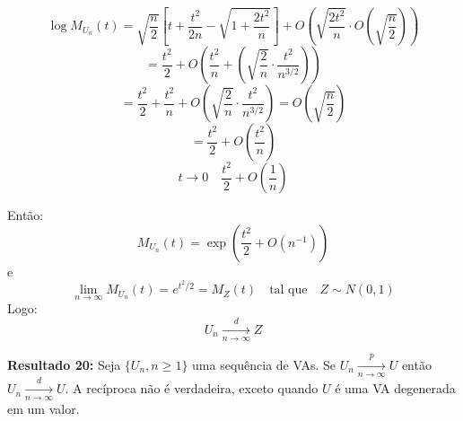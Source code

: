 \[
\log M_{U_n}(t) = \sqrt{\frac{n}{2}} \left[ t + \frac{t^2}{2n} - \sqrt{1 + \frac{2t^2}{n}} \right] + O\left( \sqrt{\frac{2t^2}{n}} \cdot O\left( \sqrt{\frac{n}{2}} \right) \right)
\]
\[
= \frac{t^2}{2} + O\left( \frac{t^2}{n} + \left( \sqrt{\frac{2}{n}} \cdot \frac{t^2}{n^{3/2}} \right) \right)
\]
\[
= \frac{t^2}{2} + \frac{t^2}{n} + O\left( \sqrt{\frac{2}{n}} \cdot \frac{t^2}{n^{3/2}} \right) = O\left( \sqrt{\frac{n}{2}} \right)
\]
\[
= \frac{t^2}{2} + O\left( \frac{t^2}{n} \right)
\]
\[
t \to 0 \quad \frac{t^2}{2} + O\left( \frac{1}{n} \right)
\]

Então:
\[
M_{U_n}(t) = \exp\left( \frac{t^2}{2} + O(n^{-1}) \right)
\]
e
\[
\lim_{n \to \infty} M_{U_n}(t) = e^{t^2/2} = M_Z(t) \quad \text{tal que} \quad Z \sim N(0,1)
\]
Logo:
\[
U_n \xrightarrow[n \to \infty]{d} Z
\]

\textbf{Resultado 20:} Seja $\{U_n, n \geq 1\}$ uma sequência de VAs. Se $U_n \xrightarrow[n \to \infty]{p} U$ então $U_n \xrightarrow[n \to \infty]{d} U$. A recíproca não é verdadeira, exceto quando $U$ é uma VA degenerada em um valor.